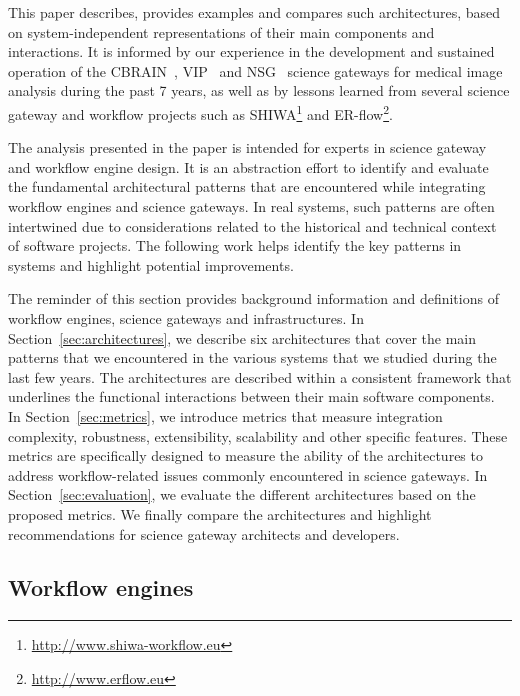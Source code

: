 \documentclass[preprint,3p,twocolumn]{elsarticle}
\newcommand{\correction}[1]{\color{blue}#1\color{black}\xspace}
\begin{document}
This paper describes, provides examples and compares such
architectures, based on system-independent representations of their
main components and interactions. It is informed by our experience in
the development and sustained operation of the CBRAIN~\cite{SHER-14},
VIP~\cite{GLAT-13} and NSG~\cite{shahand2015data,shahand:2012jgc}
science gateways for medical image analysis during the past 7 years,
as well as by lessons learned from several science gateway and
workflow projects such as
SHIWA\footnote{\url{http://www.shiwa-workflow.eu}} and
ER-flow\footnote{\url{http://www.erflow.eu}}.

\correction{The analysis presented in the paper is intended for
experts in science gateway and workflow engine design. It is an
abstraction effort to identify and evaluate the fundamental
architectural patterns that are encountered while integrating workflow
engines and science gateways. In real systems, such patterns are often
intertwined due to considerations related to the historical and
technical context of software projects. The following work helps
identify the key patterns in systems and highlight potential
improvements.}

\correction{The reminder of this section provides} background
information and definitions of workflow engines, science gateways and
infrastructures. In Section~\ref{sec:architectures}, we describe six
architectures that cover the main patterns that we encountered in the
various systems that we studied during the last few years. The
architectures are described within a consistent framework that
underlines the functional interactions between their main software
components. \correction{In Section~\ref{sec:metrics}, we introduce
  metrics that measure integration complexity, robustness,
  extensibility, scalability and other specific features. These
  metrics are specifically designed to measure the ability of the
  architectures to address workflow-related issues commonly
  encountered in science gateways. In Section~\ref{sec:evaluation}, we
  evaluate the different architectures based on the proposed metrics.}
We finally compare the architectures and highlight recommendations for
science gateway architects and developers.

\subsection{Workflow engines}
\end{document}
